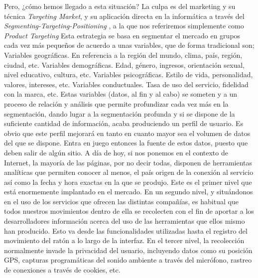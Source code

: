 \documentclass[12pt,a4paper,oneside]{book} %
\begin{document}
Pero, ¿cómo hemos llegado a esta situación? La culpa es del marketing y su técnica \textit{Targeting Market}, y su aplicación directa en la informática a través del \textit{Segmenting-Targeting-Positioning} \cite{STP}, a la que nos referiremos simplemente como \textit{Product Targeting}
\newline \newline
Esta estrategia se basa en segmentar el mercado en grupos cada vez más pequeños de acuerdo a unas variables, que de forma tradicional son; 
Variables geográficas. En referencia a la región del mundo, clima, país, región, ciudad, etc. 
Variables demográficas. Edad, género, ingresos, orientación sexual, nivel educativo, cultura, etc. 
Variables psicográficas. Estilo de vida, personalidad, valores, intereses, etc. 
Variables conductuales. Tasa de uso del servicio, fidelidad con la marca, etc. 
\newline \newline
Estas variables (datos, al fin y al cabo) se someten y a un proceso de relación y análisis que permite profundizar cada vez más en la segmentación, dando lugar a la segmentación profunda y si se dispone de la suficiente cantidad de información, acaba produciendo un perfil de usuario. Es obvio que este perfil mejorará en tanto en cuanto mayor sea el volumen de datos del que se dispone. 
\newline \newline
Entra en juego entonces la fuente de estos datos, puesto que deben salir de algún sitio. A día de hoy, si nos ponemos en el contexto de Internet, la mayoría de las páginas, por no decir todas, disponen de herramientas analíticas que permiten conocer al menos, el país origen de la conexión al servicio así como la fecha y hora exactas en la que se produjo. Este es el primer nivel que está enormemente implantado en el mercado. 
\newline \newline
En un segundo nivel, y situándonos en el uso de los servicios que ofrecen las distintas compañías, es habitual que todos nuestros movimientos dentro de ella se recolecten con el fin de aportar a los desarrolladores información acerca del uso de las herramientas que ellos mismo han producido. Esto va desde las funcionalidades utilizadas hasta el registro del movimiento del ratón a lo largo de la interfaz. 
\newline \newline
En el tercer nivel, la recolección normalmente invade la privacidad del usuario, incluyendo datos como su posición GPS, capturas programáticas del sonido ambiente a través del micrófono, rastreo de conexiones a través de cookies, etc. 
\end{document}
